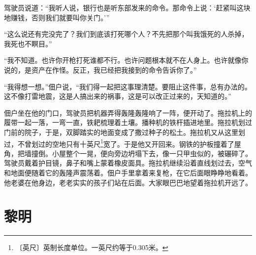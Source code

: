 \documentclass[12pt,UTF-8,openany]{ctexbook}
\begin{document}
\begin{normalsize}
    驾驶员说道：“我听人说，银行也是听东部发来的命令。那命令上说：‘赶紧叫这块地赚钱，否则我们就要叫你关门。’”
    
    “这么说还有完没完了？我们到底该打死哪个人？不先把那个叫我饿死的人杀掉，我死也不瞑目。”
    
    “我不知道。也许你开枪打死谁都不行。也许问题根本就不在人身上。也许就像你说的，是资产在作怪。反正，我已经把我接到的命令告诉你了。”
    
    “我得想一想。”佃户说，“我们得一起把这事理清楚。要阻止这件事，总有办法的。这不像打雷地震，这是人搞出来的祸事，这是可以改正过来的，天知道的。”
    
    佃户坐在他的门口，驾驶员把机器弄得轰隆轰隆响了一阵，便开动了。拖拉机上的履带一起一落，一弯一直，铁耙梳理着土壤。播种机的铁杆插进地里。拖拉机划过门前的院子，于是，双脚踏实的地面变成了撒过种子的松土。拖拉机又从这里划过，不曾划过的空地只有十英尺\footnote{〔英尺〕英制长度单位。一英尺约等于0.305米。}宽了。于是他又开回来。钢铁的护板撞着了屋角，把墙撞倒。小屋整个一晃，便向旁边坍塌下去，像一只甲虫似的，被碾碎了。驾驶员戴着护目镜，鼻子和嘴上蒙着橡皮面具。拖拉机继续沿着直线划过去，空气和地面便随着它的轰隆声震荡着。佃户手里拿着来复枪，在它后面眼睁睁地看着。他老婆在他身边，老老实实的孩子们站在后面。大家眼巴巴地望着拖拉机开远了。
    
\end{normalsize}



\chapter{黎明}
\end{document}
